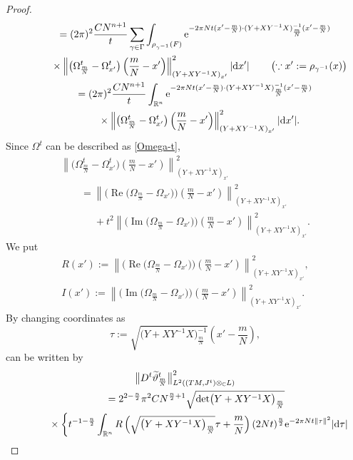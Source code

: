 \documentclass[10pt,a4paper]{amsart}
\numberwithin{equation}{section}
\newcommand{\C}{\mathbb{C}}
\newcommand{\R}{\mathbb{R}}
\renewcommand{\tilde}{\widetilde}
\newcommand{\abs}[1]{\lvert#1\rvert}
\newcommand{\norm}[1]{\lVert#1\rVert}
\def\re{\operatorname{Re}}
\def\im{\operatorname{Im}}
\begin{document}
\begin{proof}
\begin{gather*}
\qquad= (2\pi)^2\frac{C N^{n+1}}{t}\sum_{\gamma \in \Gamma}\int_{\rho_{\gamma^{-1}}(F)} {\rm e}^{-2\pi Nt(x'-\frac{m}{N})\cdot ( Y+XY^{-1}X)^{-1}_{\frac{m}{N}}(x'-\frac{m}{N})} \\
\phantom{\qquad=}{} \times \left\lVert \bigl( \Omega^t_{\frac{m}{N}}-\Omega^t_{x'}\bigr)\left(\frac{m}{N}-x'\right)\right\rVert ^2_{(Y+XY^{-1}X)_{x'}}\abs{{\rm d}x'}\qquad \left(\because x':=\rho_{\gamma^{-1}}(x)\right) \\
\qquad= (2\pi)^2\frac{C N^{n+1}}{t}\int_{\R^n} {\rm e}^{-2\pi Nt(x'-\frac{m}{N})\cdot ( Y+XY^{-1}X)^{-1}_{\frac{m}{N}}(x'-\frac{m}{N})}\\
\phantom{\qquad=}{} \times \left\lVert \bigl( \Omega^t_{\frac{m}{N}}-\Omega^t_{x'}\bigr)\left(\frac{m}{N}-x'\right)\right\rVert ^2_{(Y+XY^{-1}X)_{x'}}\abs{{\rm d}x'}.
\end{gather*}
Since $\Omega^t$ can be described as \eqref{Omega-t},
\begin{gather*}
\left\lVert \bigl( \Omega^t_{\frac{m}{N}}-\Omega^t_{x'}\bigr)\left(\frac{m}{N}-x'\right)\right\rVert ^2_{(Y+XY^{-1}X)_{x'}}\\
\qquad=\left\lVert \bigl(\re \bigl( \Omega_{\frac{m}{N}}-\Omega_{x'}\bigr)\bigr)\left(\frac{m}{N}-x'\right)\right\rVert ^2_{(Y+XY^{-1}X)_{x'}}\\
\phantom{\qquad=}{} +t^2\left\lVert \bigl(\im \bigl( \Omega_{\frac{m}{N}}-\Omega_{x'}\bigr)\bigr)\left(\frac{m}{N}-x'\right)\right\rVert ^2_{(Y+XY^{-1}X)_{x'}}.
\end{gather*}
We put
\begin{gather*}
R(x'):=\left\lVert \bigl(\re \bigl( \Omega_{\frac{m}{N}}-\Omega_{x'}\bigr)\bigr)\left(\frac{m}{N}-x'\right)\right\rVert ^2_{(Y+XY^{-1}X)_{x'}}, \\
I(x'):=\left\lVert \bigl(\im \bigl( \Omega_{\frac{m}{N}}-\Omega_{x'}\bigr)\bigr)\left(\frac{m}{N}-x'\right)\right\rVert ^2_{(Y+XY^{-1}X)_{x'}}.
\end{gather*}
By changing coordinates as
\[
\tau:=\sqrt{\bigl(Y+XY^{-1}X\bigr)_{\frac{m}{N}}^{-1}}\left(x'-\frac{m}{N}\right),
\]
 \smash{$\big\|D^t {\tilde \vartheta}^t_{\frac{m}{N}}\big\|_{L^2((TM, J^t)\otimes_{\C}L)}^2$} can be written by
\begin{gather*}
\big\|D^t {\tilde \vartheta}^t_{\frac{m}{N}}\big\|_{L^2((TM, J^t)\otimes_{\C}L)}^2 \\
\qquad{}
 = 2^{2-\frac{n}{2}}\pi^2 C N^{\frac{n}{2}+1}\sqrt{\det \bigl(Y+XY^{-1}X\bigr)_{\frac{m}{N}}}\\
\phantom{\qquad=}{}\times \left\{ t^{-1-\frac{n}{2}} \int_{\R^n} R\left(\sqrt{\bigl(Y+XY^{-1}X\bigr)_{\frac{m}{N}}}\tau +\frac{m}{N}\right)(2Nt)^\frac{n}{2} {\rm e}^{-2\pi Nt\norm{\tau}^2}\abs{{\rm d}\tau} \right.\\

\end{gather*}
\end{proof}
\end{document}
